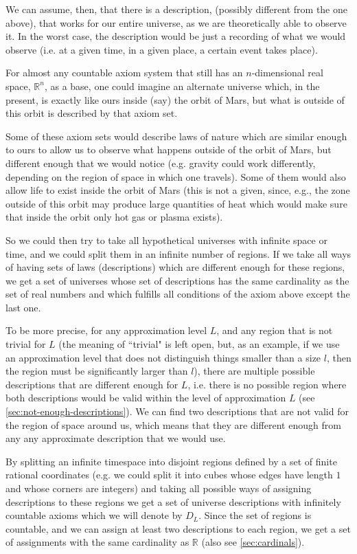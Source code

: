 \documentclass[a4paper
,draft
]{article}
\def\reale{\mathbb{R}}
\def\descriptions{D_L}
\newcommand{\ghilimele}[1]{``#1"}
\begin{document}
We can assume, then, that there is a description,
(possibly different from the one above), that works for our entire universe,
as we are theoretically able to observe it. In the worst case, the description
would be just a recording of what we would observe (i.e. at a given time, in
a given place, a certain event takes place).

For almost any countable axiom system that still
has an $n$-dimensional real space, $\reale^n$, as a base,
one could imagine an alternate universe
which, in the present, is exactly like ours inside (say) the orbit of Mars,
but what is outside of this orbit is described by that axiom set.

Some of these axiom sets would describe laws of nature which are similar enough
to ours to allow us to observe what happens outside of the orbit of Mars,
but different enough that
we would notice (e.g. gravity could work differently, depending on the region
of space in which one travels). Some of them would also allow life
to exist inside the orbit of Mars (this is not a given, since, e.g., the zone
outside of this orbit may produce large quantities of heat which
would make sure that inside the orbit only hot gas or plasma exists).

So we could then try to take all hypothetical universes with infinite space
or time, and we could split them in an infinite number of regions. If we take
all ways of having sets of laws (descriptions) which are different enough
for these regions,
we get a set of universes whose set of descriptions has the same cardinality
as the set of real numbers and which fulfills all conditions of the axiom
above except the last one.

To be more precise, for any approximation level $L$, and any region that
is not trivial for $L$
(the meaning of \ghilimele{trivial} is left open, but, as an example,
if we use an approximation level that does not distinguish things smaller
than a size $l$, then the region must be significantly larger than $l$),
there are multiple possible descriptions that
are different enough for $L$, i.e. there is no possible region where both
descriptions
would be valid within the level of approximation $L$
(see \ref{sec:not-enough-descriptions}).
We can find two descriptions that are not valid for the region of space around
us, which means that they are different enough from any any approximate
description that we would use.

By splitting an infinite timespace
into disjoint regions defined by a set of finite rational coordinates
(e.g. we could split it into cubes whose edges have length $1$ and whose
corners are integers)
and taking all possible ways of assigning descriptions to these regions
we get a set of universe descriptions with infinitely countable axioms
which we will denote by $\descriptions$.
Since the set of regions is countable, and we can assign at least two
descriptions to each region, we get a set of assignments with the same
cardinality as $\reale$ (also see \ref{sec:cardinals}).
\end{document}
